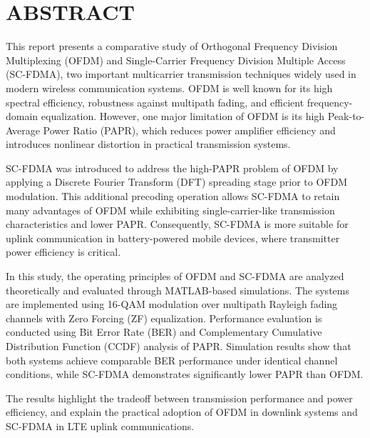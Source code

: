 \section*{ABSTRACT}

This report presents a comparative study of Orthogonal Frequency Division
Multiplexing (OFDM) and Single-Carrier Frequency Division Multiple Access
(SC-FDMA), two important multicarrier transmission techniques widely used
in modern wireless communication systems. OFDM is well known for its high
spectral efficiency, robustness against multipath fading, and efficient
frequency-domain equalization. However, one major limitation of OFDM is
its high Peak-to-Average Power Ratio (PAPR), which reduces power amplifier
efficiency and introduces nonlinear distortion in practical transmission
systems.

SC-FDMA was introduced to address the high-PAPR problem of OFDM by
applying a Discrete Fourier Transform (DFT) spreading stage prior to OFDM
modulation. This additional precoding operation allows SC-FDMA to retain
many advantages of OFDM while exhibiting single-carrier-like transmission
characteristics and lower PAPR. Consequently, SC-FDMA is more suitable for
uplink communication in battery-powered mobile devices, where transmitter
power efficiency is critical.

In this study, the operating principles of OFDM and SC-FDMA are analyzed
theoretically and evaluated through MATLAB-based simulations. The systems
are implemented using 16-QAM modulation over multipath Rayleigh fading
channels with Zero Forcing (ZF) equalization. Performance evaluation is
conducted using Bit Error Rate (BER) and Complementary Cumulative
Distribution Function (CCDF) analysis of PAPR. Simulation results show
that both systems achieve comparable BER performance under identical
channel conditions, while SC-FDMA demonstrates significantly lower PAPR
than OFDM.

The results highlight the tradeoff between transmission performance and
power efficiency, and explain the practical adoption of OFDM in downlink
systems and SC-FDMA in LTE uplink communications.

\newpage
\clearpage